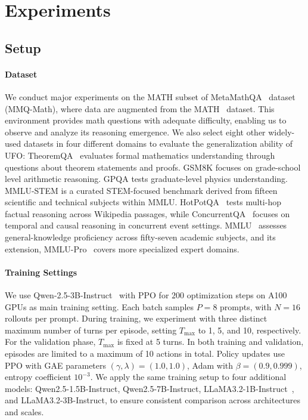 % 
\section{Experiments}
\label{sec:exp}

\subsection{Setup}
\label{sec:exp_setup}
\paragraph{Dataset}
We conduct major experiments on the {MATH} subset of {MetaMathQA}~\citep{metamathqa} dataset (MMQ-Math), where data are augmented from the MATH~\citep{hendrycks2021measuringmathematicalproblem} dataset. This environment provides math questions with adequate difficulty, enabling us to observe and analyze its reasoning emergence. We also select eight other widely-used datasets in four different domains to evaluate the generalization ability of UFO: TheoremQA~\citep{theoremqa} evaluates formal mathematics understanding through questions about theorem statements and proofs. GSM8K\citep{gsm8k} focuses on grade-school level arithmetic reasoning. GPQA\citep{gpqa} tests graduate-level physics understanding. MMLU-STEM\citep{MMLU} is a curated STEM-focused benchmark derived from fifteen scientific and technical subjects within MMLU. HotPotQA~\citep{hotpotqa} tests multi-hop factual reasoning across Wikipedia passages, while ConcurrentQA~\citep{concurrentqa} focuses on temporal and causal reasoning in concurrent event settings. MMLU~\citep{MMLU} assesses general-knowledge proficiency across fifty-seven academic subjects, and its extension, MMLU-Pro~\citep{MMLUPro} covers more specialized expert domains.

\paragraph{Training Settings}
We use Qwen-2.5-3B-Instruct~\citep{qwen25} with {PPO} for $200$ optimization steps on A100 GPUs as main training setting. Each batch samples $P{=}8$ prompts, with $N{=}16$ rollouts per prompt. During training, we experiment with three distinct maximum number of turns per episode, setting $T_{\text{max}}$ to 1, 5, and 10, respectively. For the validation phase, $T_{\text{max}}$ is fixed at 5 turns. In both training and validation, episodes are limited to a maximum of 10 actions in total. Policy updates use PPO with GAE parameters $(\gamma,\lambda)=(1.0,1.0)$, Adam with $\beta=(0.9,0.999)$, entropy coefficient $10^{-3}$. We apply the same training setup to four additional models: Qwen2.5-1.5B-Instruct, Qwen2.5-7B-Instruct, LLaMA3.2-1B-Instruct~\citep{llama3_2_blog}, and LLaMA3.2-3B-Instruct, to ensure consistent comparison across architectures and scales.
    
